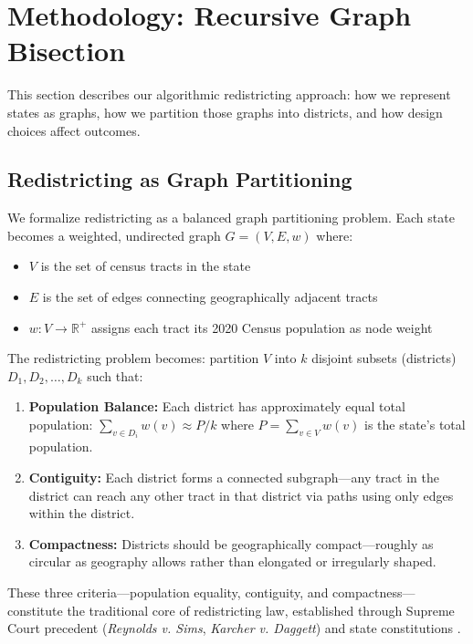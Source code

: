\section{Methodology: Recursive Graph Bisection}
\label{sec:methodology}

This section describes our algorithmic redistricting approach: how we represent states as graphs, how we partition those graphs into districts, and how design choices affect outcomes.

\subsection{Redistricting as Graph Partitioning}

We formalize redistricting as a balanced graph partitioning problem. Each state becomes a weighted, undirected graph $G = (V, E, w)$ where:

\begin{itemize}
    \item $V$ is the set of census tracts in the state
    \item $E$ is the set of edges connecting geographically adjacent tracts
    \item $w: V \to \mathbb{R}^+$ assigns each tract its 2020 Census population as node weight
\end{itemize}

The redistricting problem becomes: partition $V$ into $k$ disjoint subsets (districts) $D_1, D_2, \ldots, D_k$ such that:

\begin{enumerate}
    \item \textbf{Population Balance:} Each district has approximately equal total population: $\sum_{v \in D_i} w(v) \approx P/k$ where $P = \sum_{v \in V} w(v)$ is the state's total population.

    \item \textbf{Contiguity:} Each district forms a connected subgraph—any tract in the district can reach any other tract in that district via paths using only edges within the district.

    \item \textbf{Compactness:} Districts should be geographically compact—roughly as circular as geography allows rather than elongated or irregularly shaped.
\end{enumerate}

These three criteria—population equality, contiguity, and compactness—constitute the traditional core of redistricting law, established through Supreme Court precedent (\textit{Reynolds v. Sims}, \textit{Karcher v. Daggett}) and state constitutions \cite{reynolds1964,karcher1983}.

